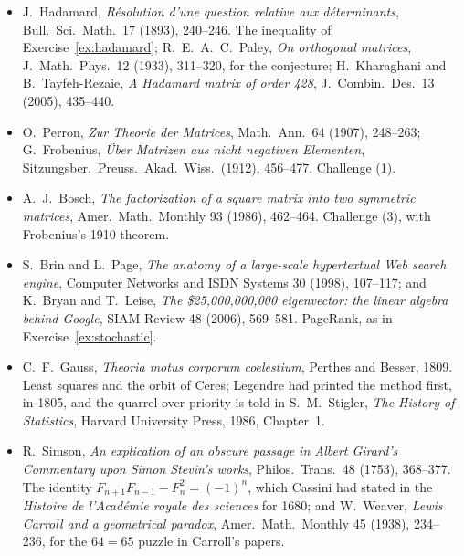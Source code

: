 \begin{itemize}
\item J.~Hadamard, \emph{R\'esolution d'une question relative aux d\'eterminants}, Bull.\ Sci.\ Math.\ 17 (1893), 240--246. The inequality of Exercise~\ref{ex:hadamard}; R.~E.~A.~C.~Paley, \emph{On orthogonal matrices}, J.\ Math.\ Phys.\ 12 (1933), 311--320, for the conjecture; H.~Kharaghani and B.~Tayfeh-Rezaie, \emph{A Hadamard matrix of order 428}, J.\ Combin.\ Des.\ 13 (2005), 435--440.
\item O.~Perron, \emph{Zur Theorie der Matrices}, Math.\ Ann.\ 64 (1907), 248--263; G.~Frobenius, \emph{\"Uber Matrizen aus nicht negativen Elementen}, Sitzungsber.\ Preuss.\ Akad.\ Wiss.\ (1912), 456--477. Challenge (1).
\item A.~J.~Bosch, \emph{The factorization of a square matrix into two symmetric matrices}, Amer.\ Math.\ Monthly 93 (1986), 462--464. Challenge (3), with Frobenius's 1910 theorem.
\item S.~Brin and L.~Page, \emph{The anatomy of a large-scale hypertextual Web search engine}, Computer Networks and ISDN Systems 30 (1998), 107--117; and K.~Bryan and T.~Leise, \emph{The \$25{,}000{,}000{,}000 eigenvector: the linear algebra behind Google}, SIAM Review 48 (2006), 569--581. PageRank, as in Exercise~\ref{ex:stochastic}.
\item C.~F.~Gauss, \emph{Theoria motus corporum coelestium}, Perthes and Besser, 1809. Least squares and the orbit of Ceres; Legendre had printed the method first, in 1805, and the quarrel over priority is told in S.~M.~Stigler, \emph{The History of Statistics}, Harvard University Press, 1986, Chapter~1.
\item R.~Simson, \emph{An explication of an obscure passage in Albert Girard's Commentary upon Simon Stevin's works}, Philos.\ Trans.\ 48 (1753), 368--377. The identity $F_{n+1}F_{n-1}-F_n^2=(-1)^n$, which Cassini had stated in the \emph{Histoire de l'Acad\'emie royale des sciences} for 1680; and W.~Weaver, \emph{Lewis Carroll and a geometrical paradox}, Amer.\ Math.\ Monthly 45 (1938), 234--236, for the $64=65$ puzzle in Carroll's papers.
\end{itemize}
